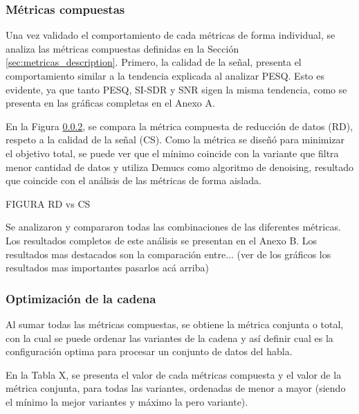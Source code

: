 \subsubsection{Métricas compuestas}
Una vez validado el comportamiento de cada métricas de forma individual, se analiza las métricas compuestas definidas en la Sección \ref{sec:metricas_description}. Primero, la calidad de la señal, presenta el comportamiento similar a la tendencia explicada al analizar PESQ. Esto es evidente, ya que tanto PESQ, SI-SDR y SNR sigen la misma tendencia, como se presenta en las gráficas completas en el Anexo A.

En la Figura \ref{}, se compara la métrica compuesta de reducción de datos (RD), respeto a la calidad de la señal (CS). Como la métrica se diseñó para minimizar el objetivo total, se puede ver que el mínimo coincide con la variante que filtra menor cantidad de datos y utiliza Demucs como algoritmo de denoising, resultado que coincide con el análisis de las métricas de forma aislada.

FIGURA RD vs CS

Se analizaron y compararon todas las combinaciones de las diferentes métricas. Los resultados completos de este análisis se presentan en el Anexo B. Los resultados mas destacados son la comparación entre...
(ver de los gráficos los resultados mas importantes pasarlos acá arriba)


\subsubsection{Optimización de la cadena}
Al sumar todas las métricas compuestas, se obtiene la métrica conjunta o total, con la cual se puede ordenar las variantes de la cadena y así definir cual es la configuración optima para procesar un conjunto de datos del habla.

En la Tabla X, se presenta el valor de cada métricas compuesta y el valor de la métrica conjunta, para todas las variantes, ordenadas de menor a mayor (siendo el mínimo la mejor variantes y máximo la pero variante).


